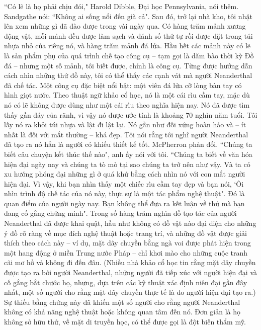 \begin{multicols}{2}
	\vskip 0.1cm
	``Có lẽ là họ phải chịu đói," Harold Dibble, Đại học Pennsylvania, nói thêm.
	\vskip 0.1cm
	Sandgathe nói: ``Không ai sống nổi đến già cả".
	\vskip 0.1cm
	Sau đó, trở lại nhà kho, tôi nhặt lên xem những gì đã đào được trong vài ngày qua. Có hàng trăm mảnh xương động vật, mỗi mảnh đều được làm sạch và đánh số thứ tự rồi được đặt trong túi nhựa nhỏ của riêng nó, và hàng trăm mảnh đá lửa. Hầu hết các mảnh này có lẽ là sản phẩm phụ của quá trình chế tạo công cụ -- tạm gọi là dăm bào thời kỳ Đồ đá -- nhưng một số mảnh, tôi biết được, chính là công cụ. Từng được hướng dẫn cách nhìn những thứ đồ này, tôi có thể thấy các cạnh vát mà người Neanderthal đã chế tác. Một công cụ đặc biệt nổi bật: một viên đá lửa cỡ lòng bàn tay có hình giọt nước. Theo thuật ngữ khảo cổ học, nó là một cái rìu cầm tay, mặc dù nó có lẽ không được dùng như một cái rìu theo nghĩa hiện nay. Nó đã được tìm thấy gần đáy của rãnh, vì vậy nó được ước tính là khoảng $70$ nghìn năm tuổi. Tôi lấy nó ra khỏi túi nhựa và lật đi lật lại. Nó gần như đối xứng hoàn hảo và -- ít nhất là đối với mắt thường -- khá đẹp. Tôi nói rằng tôi nghĩ người Neanderthal đã tạo ra nó hẳn là người có khiếu thiết kế tốt. McPherron phản đối.
	\vskip 0.1cm
	``Chúng ta biết câu chuyện kết thúc thế nào", anh ấy nói với tôi. ``Chúng ta biết về văn hóa hiện đại ngày nay và chúng ta tò mò tại sao chúng ta trở nên như vậy. Và ta có xu hướng phóng đại những gì ở quá khứ bằng cách nhìn nó với con mắt người hiện đại. Vì vậy, khi bạn nhìn thấy một chiếc rìu cầm tay đẹp và bạn nói, ‘Ôi nhìn trình độ chế tác của nó này, thực sự là một tác phẩm nghệ thuật". Đó là quan điểm của người ngày nay. Bạn không thể đưa ra kết luận về thứ mà bạn đang cố gắng chứng minh".
	\vskip 0.1cm
	Trong số hàng trăm nghìn đồ tạo tác của người Neanderthal đã được khai quật, hầu như không có đồ vật nào đại diện cho những ý đồ rõ ràng về mục đích nghệ thuật hoặc trang trí, và những đồ vật được giải thích theo cách này -- ví dụ, mặt dây chuyền bằng ngà voi được phát hiện trong một hang động ở miền Trung nước Pháp -- chỉ khơi mào cho những cuộc tranh cãi mơ hồ và không đi đến đâu. (Nhiều nhà khảo cổ học tin rằng mặt dây chuyền được tạo ra bởi người Neanderthal, những người đã tiếp xúc với người hiện đại và cố gắng bắt chước họ, nhưng, dựa trên các kỹ thuật xác định niên đại gần đây nhất, một số người cho rằng mặt dây chuyền thực tế là do người hiện đại tạo ra.) Sự thiếu bằng chứng này đã khiến một số người cho rằng người Neanderthal không có khả năng nghệ thuật hoặc không quan tâm đến nó. Đơn giản là họ không sở hữu thứ, về mặt di truyền học, có thể được gọi là đột biến thẩm mỹ.

\end{multicols}
